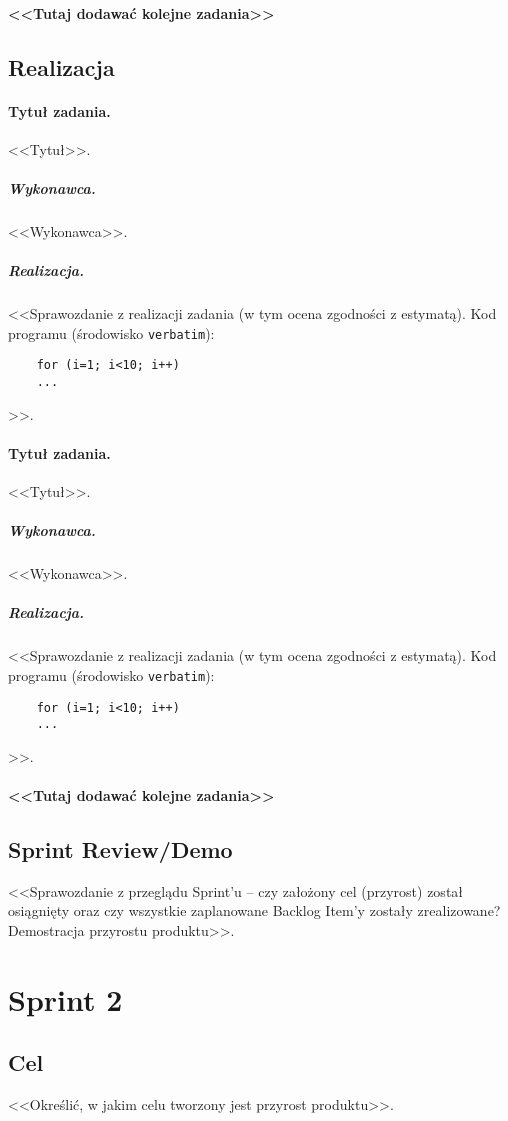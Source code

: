\documentclass[a4paper]{article}
\begin{document}
	\paragraph{<<Tutaj dodawać kolejne zadania>>}
	
	\subsection{Realizacja}
	
	\paragraph{Tytuł zadania.} <<Tytuł>>.
	\subparagraph{Wykonawca.} <<Wykonawca>>.
	\subparagraph{Realizacja.} <<Sprawozdanie z realizacji zadania (w tym ocena zgodności z estymatą). Kod programu (środowisko \texttt{verbatim}): \begin{verbatim}
	for (i=1; i<10; i++)
	...
	\end{verbatim}>>.
	
	\paragraph{Tytuł zadania.} <<Tytuł>>.
	\subparagraph{Wykonawca.} <<Wykonawca>>.
	\subparagraph{Realizacja.} <<Sprawozdanie z realizacji zadania (w tym ocena zgodności z estymatą). Kod programu (środowisko \texttt{verbatim}): \begin{verbatim}
	for (i=1; i<10; i++)
	...
	\end{verbatim}>>.
	
	\paragraph{<<Tutaj dodawać kolejne zadania>>}
	
	
	\subsection{Sprint Review/Demo}
	<<Sprawozdanie z przeglądu Sprint'u -- czy założony cel (przyrost) został osiągnięty oraz czy wszystkie zaplanowane Backlog Item'y zostały zrealizowane? Demostracja przyrostu produktu>>.
	
	\section{Sprint 2}
	
	\subsection{Cel} <<Określić, w jakim celu tworzony jest przyrost produktu>>.
	
\end{document}
